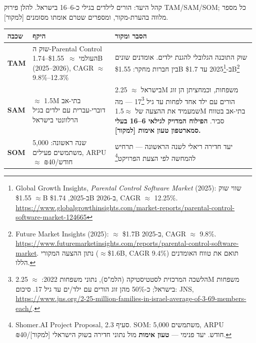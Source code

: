 \documentclass[11pt]{article}
\newcommand{\en}[1]{\textenglish{#1}}
\begin{document}
קהל היעד: הורים לילדים בגילי כ-6--16 בישראל. להלן פירוק \en{TAM/SAM/SOM}; כל מספר מלווה בהערת-מקור, ומספרים שטרם אומתו מסומנים \en{[}למקור\en{]}.

\begin{longtable}{|>{\raggedright\arraybackslash}p{2.2cm}|>{\raggedright\arraybackslash}p{4.0cm}|>{\raggedright\arraybackslash}p{8.5cm}|}
\hline
\rowcolor{hdr}
\textbf{שכבה} & \textbf{היקף} & \textbf{הסבר ומקור} \\
\hline
\endhead

\textbf{\en{TAM}} &
שוק ה-\en{Parental Control} העולמי \mbox{$\approx$ \en{\$1.55--1.74B}} (\en{2025--2026}), \en{CAGR} $\approx$ \en{9.8\%--12.3\%} &
שוק התוכנה הגלובלי להגנת ילדים. אומדנים שונים בין חברות מחקר: \en{\$1.55B} ב-\en{2025}\footnote{\en{Global Growth Insights}, \textit{Parental Control Software Market} (2025): שווי שוק $\approx$ \en{\$1.55B} ב-\en{2025}, \en{\$1.74B} ב-\en{2026}, \en{CAGR} $\approx$ \en{12.25\%}. \url{https://www.globalgrowthinsights.com/market-reports/parental-control-software-market-124665}} עד \en{\$1.7B}\footnote{\en{Future Market Insights} (2025): $\approx$ \en{\$1.7B} ב-\en{2025}, \en{CAGR} $\approx$ \en{9.8\%}. \url{https://www.futuremarketinsights.com/reports/parental-control-software-market}. נתון ההצעה המקורי ($\approx$\en{\$1.6B}, \en{CAGR 9.4\%}) תואם את טווח האומדנים הללו.} \\
\hline

\rowcolor{ltgray}
\textbf{\en{SAM}} &
$\approx$ \en{1.5M} בתי-אב דוברי-עברית עם ילדים בגיל הרלוונטי בישראל &
בישראל $\approx$ \en{2.25M} משפחות, וכמחציתן הן זוג הורים עם ילד אחד לפחות עד גיל \en{17}\footnote{הלשכה המרכזית לסטטיסטיקה (הלמ"ס), נתוני משפחות \en{2022}: $\approx$ \en{2.25M} משפחות בישראל; כ-\en{50\%} מהן זוג הורים עם ילד/ים עד גיל \en{17}. סיכום: \en{JNS}, \url{https://www.jns.org/2-25-million-families-in-israel-average-of-3-69-members-each/}.} — מה שמעמיד את ההצעה של $\approx$\en{1.5M} בתי-אב בטווח סביר. \textbf{הפילוח המדויק לגילאי 6--16 בעלי סמארטפון טעון אימות \en{[}למקור\en{]}.} \\
\hline

\textbf{\en{SOM}} &
שנה ראשונה: \en{5,000} משתמשים פעילים, \en{ARPU} $\approx$ ₪40/חודש &
יעד חדירה ריאלי לשנה הראשונה — תרחיש להמחשה לפי הצעת הפרויקט\footnote{\en{Shomer.AI Project Proposal}, סעיף \en{2.3}. \en{SOM}: \en{5,000} משתמשים, \en{ARPU} ₪\en{40}/חודש. יעד פנימי — \textbf{טעון אימות} מול נתוני חדירה בשוק הישראלי \en{[}למקור\en{]}.} \\
\hline
\end{longtable}
\end{document}
